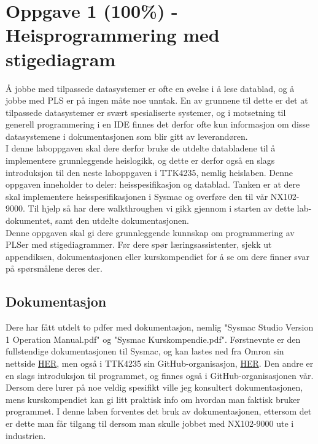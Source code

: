 \section{Oppgave 1 (100\%) - Heisprogrammering med stigediagram}\label{sec:3-oppgave1}
Å jobbe med tilpassede datasystemer er ofte en øvelse i å lese datablad, og å jobbe med PLS er på ingen måte noe unntak. En av grunnene til dette er det at tilpassede datasystemer er svært spesialiserte systemer, og i motsetning til generell programmering i en IDE finnes det derfor ofte kun informasjon om disse datasystemene i dokumentasjonen som blir gitt av leverandøren.\\

I denne laboppgaven skal dere derfor bruke de utdelte databladene til å implementere grunnleggende heislogikk, og dette er derfor også en slags introduksjon til den neste laboppgaven i TTK4235, nemlig heislaben. Denne oppgaven inneholder to deler: heisspesifikasjon og datablad. Tanken er at dere skal implementere heisspesifikasjonen i Sysmac og overføre den til vår NX102-9000. Til hjelp så har dere walkthroughen vi gikk gjennom i starten av dette lab-dokumentet, samt den utdelte dokumentasjonen.\\

Denne oppgaven skal gi dere grunnleggende kunnskap om programmering av PLSer med stigediagrammer. Før dere spør læringsassistenter, sjekk ut appendiksen, dokumentasjonen eller kurskompendiet for å se om dere finner svar på spørsmålene deres der.

\subsection{Dokumentasjon}
Dere har fått utdelt to pdfer med dokumentasjon, nemlig "Sysmac Studio Version 1 Operation Manual.pdf" og "Sysmac Kurskompendie.pdf". Førstnevnte er den fullstendige dokumentasjonen til Sysmac, og kan lastes ned fra Omron sin nettside \href{https://assets.omron.eu/downloads/manual/en/v5/w504_sysmac_studio_operation_manual_en.pdf}{HER}, men også i TTK4235 sin GitHub-organisasjon, \href{https://github.com/ITK-TTK4235}{HER}. Den andre er en slags introduksjon til programmet, og finnes også i GitHub-organisasjonen vår. Dersom dere lurer på noe veldig spesifikt ville jeg konsultert dokumentasjonen, mens kurskompendiet kan gi litt praktisk info om hvordan man faktisk bruker programmet. I denne laben forventes det bruk av dokumentasjonen, ettersom det er dette man får tilgang til dersom man skulle jobbet med NX102-9000 ute i industrien.\\

